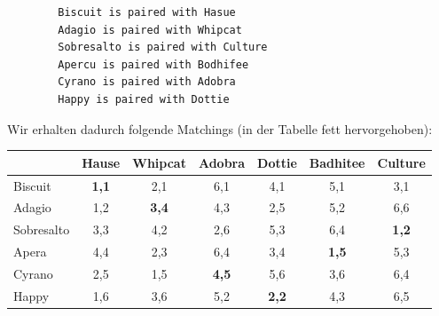 \begin{enumerate}[label=(\alph*)]
\begin{lstlisting}
        Biscuit is paired with Hasue
        Adagio is paired with Whipcat
        Sobresalto is paired with Culture
        Apercu is paired with Bodhifee
        Cyrano is paired with Adobra
        Happy is paired with Dottie
        \end{lstlisting} \par
        \clearpage 
        Wir erhalten dadurch folgende Matchings (in der Tabelle fett hervorgehoben):
        \begin{table}[h]\centering
            \begin{tabular}{|l|c|c|c|c|c|c|}
            \hline
            ~          & Hause     & Whipcat   & Adobra   & Dottie   & Badhitee   & Culture   \\ \hline
            Biscuit    & {\bf 1,1} & 2,1       & 6,1      & 4,1      & 5,1        & 3,1       \\ \hline
            Adagio     & 1,2       & {\bf3,4}  & 4,3      & 2,5      & 5,2        & 6,6       \\ \hline
            Sobresalto & 3,3       & 4,2       & 2,6      & 5,3      & 6,4        & {\bf1,2}  \\ \hline
            Apera      & 4,4       & 2,3       & 6,4      & 3,4      & {\bf1,5}   & 5,3       \\ \hline
            Cyrano     & 2,5       & 1,5       & {\bf4,5} & 5,6      & 3,6        & 6,4       \\ \hline
            Happy      & 1,6       & 3,6       & 5,2      & {\bf2,2} & 4,3        & 6,5       \\ \hline
            \end{tabular}
        \end{table}
    \end{enumerate}







